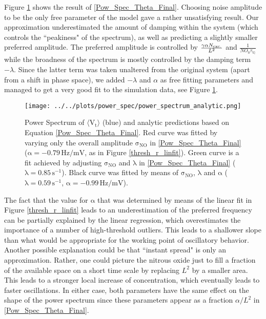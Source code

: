 \documentclass[10pt,a4paper]{article}
\begin{document}
Figure \ref{Pow_Spec_Theta_vs_Analytic} shows the result of \eqref{Pow_Spec_Theta_Final}. Choosing noise amplitude to be the only free parameter of the model gave a rather unsatisfying result. Our approximation underestimated the amount of damping within the system (which controls the ``peakiness" of the spectrum), as well as predicting a slightly smaller preferred amplitude. The preferred amplitude is controlled by $\frac{\gamma \alpha N_{\rm exc.}}{L^2}$ and $\frac{1}{NO_0\tau_{V_t}}$ while the broadness of the spectrum is mostly controlled by the damping term $-\lambda$. Since the latter term was taken unaltered from the original system (apart from a shift in phase space), we added $-\lambda$ and $\alpha$ as free fitting parameters and managed to get a very good fit to the simulation data, see Figure \ref{Pow_Spec_Theta_vs_Analytic}.   
\begin{figure}
\begin{center}
\texttt{[image: ../../plots/power\_spec/power\_spectrum\_analytic.png]}
\end{center}
\caption{Power Spectrum of $\mathrm{\langle V_t \rangle}$ (blue) and analytic predictions based on Equation \eqref{Pow_Spec_Theta_Final}. Red curve was fitted by varying only the overall amplitude $\mathrm{\sigma_{NO}}$ in \eqref{Pow_Spec_Theta_Final} ($\mathrm{\alpha = -0.79 \,Hz/mV}$, as in Figure \ref{thresh_r_linfit}). Green curve is a fit achieved by adjusting $\mathrm{\sigma_{NO}}$ and $\mathrm{\lambda}$ in \eqref{Pow_Spec_Theta_Final} ($\mathrm{\lambda = 0.85 \,s^{-1}}$). Black curve was fitted by means of $\mathrm{\sigma_{NO}}$, $\mathrm{\lambda}$ and $\mathrm{\alpha}$ ($\mathrm{\lambda = 0.59 \,s^{-1}}$, $\mathrm{\alpha=-0.99 \,Hz/mV}$).}
\label{Pow_Spec_Theta_vs_Analytic}
\end{figure}
The fact that the value for $\mathrm{\alpha}$ that was determined by means of the linear fit in Figure \ref{thresh_r_linfit} leads to an underestimation of the preferred frequency can be partially explained by the linear regression, which overestimates the importance of a number of high-threshold outliers. This leads to a shallower slope than what would be appropriate for the working point of oscillatory behavior. Another possible explanation could be that ``instant spread" is only an approximation. Rather, one could picture the nitrous oxide just to fill a fraction of the available space on a short time scale by replacing $L^2$ by a smaller area. This leads to a stronger local increase of concentration, which eventually leads to faster oscillations. In either case, both parameters have the same effect on the shape of the power spectrum since these parameters appear as a fraction $\alpha/L^2$ in \eqref{Pow_Spec_Theta_Final}. 
\end{document}
